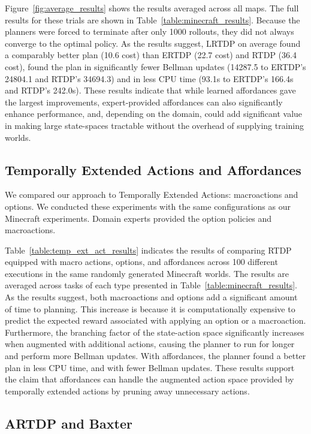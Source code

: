 \documentclass[letterpaper]{article}
\begin{document}
Figure~\ref{fig:average_results} shows the results averaged
across all maps. The full results for these trials are shown in Table~\ref{table:minecraft_results}.
Because the planners were forced to terminate after
only 1000 rollouts, they did not always converge to the optimal
policy. As the results suggest, LRTDP on average found a comparably
better plan (10.6 cost) than ERTDP (22.7 cost)  and RTDP (36.4 cost), found
the plan in significantly fewer Bellman updates (14287.5 to ERTDP's 24804.1
and RTDP's 34694.3) and in less CPU time (93.1s to ERTDP's 166.4s and RTDP's 242.0s).  These
results indicate that while learned affordances gave the largest
improvements, expert-provided affordances can also significantly
enhance performance, and, depending on the domain, could add
significant value in making large state-spaces tractable without the
overhead of supplying training worlds.

\subsection{Temporally Extended Actions and Affordances}

We compared our approach to Temporally Extended Actions: macroactions
and options. We conducted these experiments with the same
configurations as our Minecraft experiments. Domain experts provided
the option policies and macroactions.

Table~\ref{table:temp_ext_act_results} indicates the results of
comparing RTDP equipped with macro actions, options, and affordances
across 100 different executions in the same randomly generated
Minecraft worlds. The results are averaged across tasks of each
type presented in Table~\ref{table:minecraft_results}. As the results
suggest, both macroactions and options add a significant amount of
time to planning.  This increase is because it is computationally
expensive to predict the expected reward associated with applying an
option or a macroaction. Furthermore, the branching factor of the
state-action space significantly increases when augmented with
additional actions, causing the planner to run for longer and perform
more Bellman updates. With affordances, the planner found a better
plan in less CPU time, and with fewer Bellman updates. These results
support the claim that affordances can handle the augmented action
space provided by temporally extended actions by pruning away
unnecessary actions.

\subsection{ARTDP and Baxter}
\end{document}
